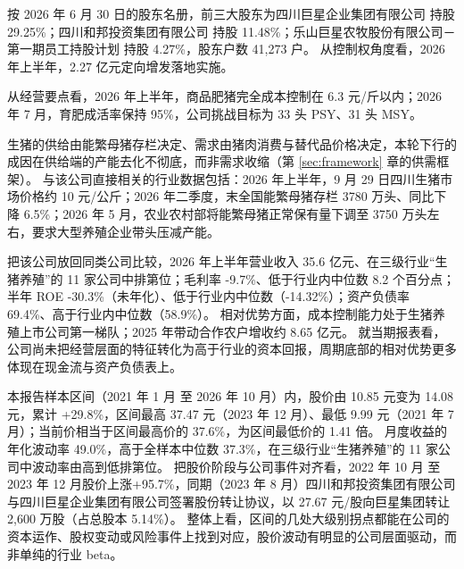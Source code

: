 按 2026 年 6 月 30 日的股东名册，前三大股东为四川巨星企业集团有限公司 持股 29.25\%；四川和邦投资集团有限公司 持股 11.48\%；乐山巨星农牧股份有限公司－第一期员工持股计划 持股 4.27\%，股东户数 41,273 户。 从控制权角度看，2026 年上半年，2.27 亿元定向增发落地实施。

 从经营要点看，2026 年上半年，商品肥猪完全成本控制在 6.3 元/斤以内；2026 年 7 月，育肥成活率保持 95\%，公司挑战目标为 33 头 PSY、31 头 MSY。

 生猪的供给由能繁母猪存栏决定、需求由猪肉消费与替代品价格决定，本轮下行的成因在供给端的产能去化不彻底，而非需求收缩（第 \ref{sec:framework} 章的供需框架）。 与该公司直接相关的行业数据包括：2026 年上半年，9 月 29 日四川生猪市场价格约 10 元/公斤；2026 年二季度，末全国能繁母猪存栏 3780 万头、同比下降 6.5\%；2026 年 5 月，农业农村部将能繁母猪正常保有量下调至 3750 万头左右，要求大型养殖企业带头压减产能。

 把该公司放回同类公司比较，2026 年上半年营业收入 35.6 亿元、在三级行业“生猪养殖”的 11 家公司中排第位；毛利率 -9.7\%、低于行业内中位数 8.2 个百分点；半年 ROE -30.3\%（未年化）、低于行业内中位数（-14.32\%）；资产负债率 69.4\%、高于行业内中位数（58.9\%）。 相对优势方面，成本控制能力处于生猪养殖上市公司第一梯队；2025 年带动合作农户增收约 8.65 亿元。 就当期报表看，公司尚未把经营层面的特征转化为高于行业的资本回报，周期底部的相对优势更多体现在现金流与资产负债表上。

 本报告样本区间（2021 年 1 月 至 2026 年 10 月）内，股价由 10.85 元变为 14.08 元，累计 +29.8\%，区间最高 37.47 元（2023 年 12 月）、最低 9.99 元（2021 年 7 月）；当前价相当于区间最高价的 37.6\%，为区间最低价的 1.41 倍。 月度收益的年化波动率 49.0\%，高于全样本中位数 37.3\%，在三级行业“生猪养殖”的 11 家公司中波动率由高到低排第位。 把股价阶段与公司事件对齐看，2022 年 10 月 至 2023 年 12 月股价上涨+95.7\%，同期（2023 年 8 月）四川和邦投资集团有限公司与四川巨星企业集团有限公司签署股份转让协议，以 27.67 元/股向巨星集团转让 2,600 万股（占总股本 5.14\%）。 整体上看，区间的几处大级别拐点都能在公司的资本运作、股权变动或风险事件上找到对应，股价波动有明显的公司层面驱动，而非单纯的行业 beta。

